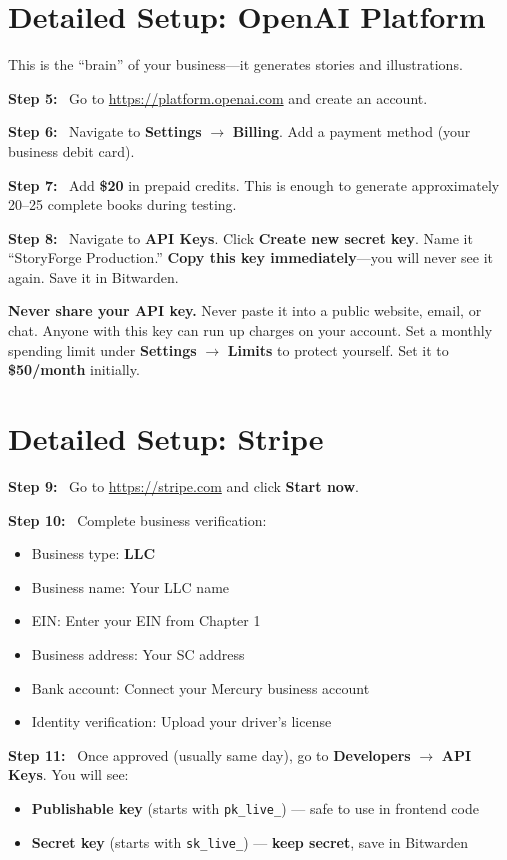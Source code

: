 \documentclass[12pt, letterpaper, oneside]{book}
\newcommand{\cost}[1]{\textcolor{money}{\textbf{#1}}}
\newcommand{\step}[1]{\noindent\textbf{\textcolor{primary}{Step #1:}}~}
\begin{document}
\section{Detailed Setup: OpenAI Platform}

This is the ``brain'' of your business---it generates stories and illustrations.

\step{5} Go to \url{https://platform.openai.com} and create an account.

\step{6} Navigate to \textbf{Settings} $\rightarrow$ \textbf{Billing}. Add a payment method (your business debit card).

\step{7} Add \cost{\$20} in prepaid credits. This is enough to generate approximately 20--25 complete books during testing.

\step{8} Navigate to \textbf{API Keys}. Click \textbf{Create new secret key}. Name it ``StoryForge Production.'' \textbf{Copy this key immediately}---you will never see it again. Save it in Bitwarden.

\begin{warningbox}
\textbf{Never share your API key.} Never paste it into a public website, email, or chat. Anyone with this key can run up charges on your account. Set a monthly spending limit under \textbf{Settings} $\rightarrow$ \textbf{Limits} to protect yourself. Set it to \cost{\$50/month} initially.
\end{warningbox}

\section{Detailed Setup: Stripe}

\step{9} Go to \url{https://stripe.com} and click \textbf{Start now}.

\step{10} Complete business verification:
\begin{itemize}[leftmargin=2em]
  \item Business type: \textbf{LLC}
  \item Business name: Your LLC name
  \item EIN: Enter your EIN from Chapter 1
  \item Business address: Your SC address
  \item Bank account: Connect your Mercury business account
  \item Identity verification: Upload your driver's license
\end{itemize}

\step{11} Once approved (usually same day), go to \textbf{Developers} $\rightarrow$ \textbf{API Keys}. You will see:
\begin{itemize}[leftmargin=2em]
  \item \textbf{Publishable key} (starts with \texttt{pk\_live\_}) --- safe to use in frontend code
  \item \textbf{Secret key} (starts with \texttt{sk\_live\_}) --- \textbf{keep secret}, save in Bitwarden
\end{itemize}
\end{document}
